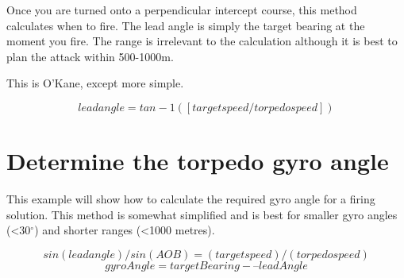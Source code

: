 \documentclass{article}
\newcommand{\degree}{$^{\circ}$}
\begin{document}
Once you are turned onto a perpendicular intercept course, this method calculates when to fire. The lead angle is simply the target bearing at the moment you fire. The range is irrelevant to the calculation although it is best to plan the attack within 500-1000m.

This is O'Kane, except more simple.

$$ lead angle = tan-1 ( [target speed / torpedo speed] ) $$


\section{Determine the torpedo gyro angle}
This example will show how to calculate the required gyro angle for a firing solution. This method is somewhat simplified and is best for smaller gyro angles (\textless 30\degree) and shorter ranges (\textless 1000 metres).

$$sin (lead angle) / sin (AOB) = (target speed) / (torpedo speed)$$
$$ gyroAngle = targetBearing -– leadAngle $$


\pagebreak
\end{document}
